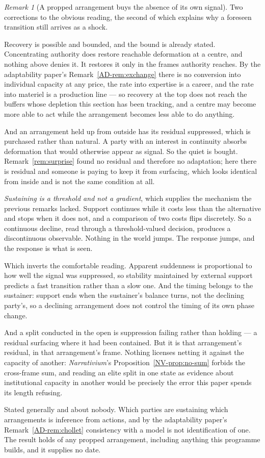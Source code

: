 \documentclass[11pt,a4paper]{article}
\theoremstyle{remark}
\newtheorem{remark}[definition]{Remark}
\begin{document}
\begin{remark}[A propped arrangement buys the absence of its own signal]\label{rem:prop}
Two corrections to the obvious reading, the second of which explains why a foreseen transition still
arrives as a shock.

Recovery is possible and bounded, and the bound is already stated. Concentrating authority does
restore reachable deformation at a centre, and nothing above denies it. It restores it only in the
frames authority reaches. By the adaptability paper's Remark~\ref{AD-rem:exchange} there is no conversion into individual capacity
at any price, the rate into expertise is a career, and the rate into materiel is a production line ---
so recovery at the top does not reach the buffers whose depletion this section has been tracking, and a
centre may become more able to act while the arrangement becomes less able to do anything.

And an arrangement held up from outside has its residual suppressed, which is purchased rather
than natural. A party with an interest in continuity absorbs deformation that would otherwise appear as
signal. So the quiet is bought. Remark~\ref{rem:surprise} found no residual and therefore no
adaptation; here there is residual and someone is paying to keep it from surfacing, which looks
identical from inside and is not the same condition at all.

\emph{Sustaining is a threshold and not a gradient}, which supplies the mechanism the previous remarks
lacked. Support continues while it costs less than the alternative and stops when it does not, and a
comparison of two costs flips discretely. So a continuous decline, read through a threshold-valued
decision, produces a discontinuous observable. Nothing in the world jumps. The response jumps, and the
response is what is seen.

Which inverts the comfortable reading. Apparent suddenness is proportional to how well the signal
was suppressed, so stability maintained by external support predicts a fast transition rather than
a slow one. And the timing belongs to the sustainer: support ends when the sustainer's balance
turns, not the declining party's, so a declining arrangement does not control the timing of its own
phase change.

And a split conducted in the open is suppression failing rather than holding --- a residual
surfacing where it had been contained. But it is that arrangement's residual, in that
arrangement's frame. Nothing licenses netting it against the capacity of another:
\emph{Narrativium}'s Proposition~\ref{NV-prop:no-sum} forbids the cross-frame sum, and reading an elite
split in one state as evidence about institutional capacity in another would be precisely the error this
paper spends its length refusing.

Stated generally and about nobody. Which parties are sustaining which arrangements is inference
from actions, and by the adaptability paper's Remark~\ref{AD-rem:chollet} consistency with a model is not identification of one.
The result holds of any propped arrangement, including anything this programme builds, and it
supplies no date.
\end{remark}
\end{document}
